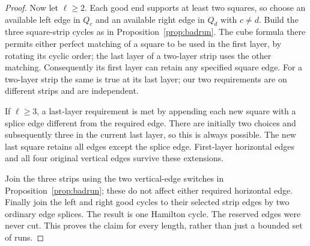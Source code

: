 \documentclass[11pt]{article}
\theoremstyle{remark}
\numberwithin{equation}{section}
\begin{document}
\begin{proof}
Now let $\ell\ge2$. Each good end supports at least two squares, so
choose an available left edge in $Q_c$ and an available right edge in
$Q_d$ with $c\ne d$. Build the three square-strip cycles as in
Proposition~\ref{prop:badrun}. The cube formula there permits either
perfect matching of a square to be used in the first layer, by rotating
its cyclic order; the last layer of a two-layer strip uses the other
matching. Consequently its first layer can retain any specified square
edge. For a two-layer strip the same is true at its last layer; our two
requirements are on different strips and are independent.

If $\ell\ge3$, a last-layer requirement is met by appending each new
square with a splice edge different from the required edge. There are
initially two choices and subsequently three in the current last
layer, so this is always possible. The new last square retains all
edges except the splice edge. First-layer horizontal edges and all
four original vertical edges survive these extensions.

Join the three strips using the two vertical-edge switches in
Proposition~\ref{prop:badrun}; these do not affect either required
horizontal edge. Finally join the left and right good cycles to their
selected strip edges by two ordinary edge splices. The result is one
Hamilton cycle. The reserved edges were never cut. This proves the
claim for every length, rather than just a bounded set of runs.
\end{proof}
\end{document}
